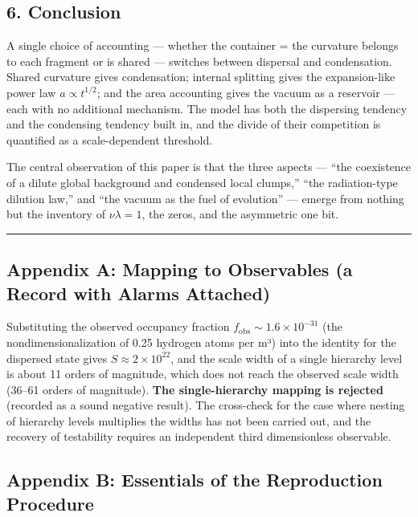 \documentclass[
]{ltjsarticle}
\begin{document}
\subsection{6. Conclusion}\label{conclusion}

A single choice of accounting --- whether the container = the curvature
belongs to each fragment or is shared --- switches between dispersal and
condensation. Shared curvature gives condensation; internal splitting
gives the expansion-like power law \(a\propto t^{1/2}\); and the area
accounting gives the vacuum as a reservoir --- each with no additional
mechanism. The model has both the dispersing tendency and the condensing
tendency built in, and the divide of their competition is quantified as
a scale-dependent threshold.

The central observation of this paper is that the three aspects ---
``the coexistence of a dilute global background and condensed local
clumps,'' ``the radiation-type dilution law,'' and ``the vacuum as the
fuel of evolution'' --- emerge from nothing but the inventory of
\(\nu\lambda=1\), the zeros, and the asymmetric one bit.

\begin{center}\rule{0.5\linewidth}{0.5pt}\end{center}

\subsection{Appendix A: Mapping to Observables (a Record with Alarms
Attached)}\label{appendix-a-mapping-to-observables-a-record-with-alarms-attached}

Substituting the observed occupancy fraction
\(f_{\mathrm{obs}}\sim1.6\times10^{-31}\) (the nondimensionalization of
0.25 hydrogen atoms per m³) into the identity for the dispersed state
gives \(S\approx2\times10^{22}\), and the scale width of a single
hierarchy level is about 11 orders of magnitude, which does not reach
the observed scale width (36--61 orders of magnitude). \textbf{The
single-hierarchy mapping is rejected} (recorded as a sound negative
result). The cross-check for the case where nesting of hierarchy levels
multiplies the widths has not been carried out, and the recovery of
testability requires an independent third dimensionless observable.

\subsection{Appendix B: Essentials of the Reproduction
Procedure}\label{appendix-b-essentials-of-the-reproduction-procedure}
\end{document}
